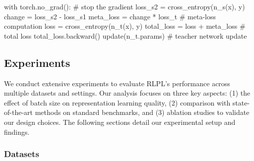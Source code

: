 \begin{algorithm}[!htbp]
\begin{algorithmic}
\State \text{}

\State \hspace{1.1em}	\textcolor{purpleish}{with} torch.no\_grad(): \textcolor{pythoncomment}{\# stop the gradient}
\State \hspace{2.5em} loss\_s2 = cross\_entropy(n\_s(x), y)
\State \hspace{1.1em} change = loss\_s2 - loss\_s1
\State \hspace{1.1em} meta\_loss = change * loss\_t \textcolor{pythoncomment}{\# meta-loss computation}
\State \hspace{1.1em} loss = cross\_entropy(n\_t(x), y)
\State \hspace{1.1em} total\_loss = loss + meta\_loss \textcolor{pythoncomment}{\# total loss}
\State \hspace{1.1em} total\_loss.backward()
\State \hspace{1.1em} update(n\_t.params) \textcolor{pythoncomment}{\# teacher network update}

\end{algorithmic}
\end{algorithm}

\subsection{Experiments}

We conduct extensive experiments to evaluate RLPL's performance across multiple datasets and settings. Our analysis focuses on three key aspects: (1) the effect of batch size on representation learning quality, (2) comparison with state-of-the-art methods on standard benchmarks, and (3) ablation studies to validate our design choices. The following sections detail our experimental setup and findings.

\subsubsection{Datasets}


